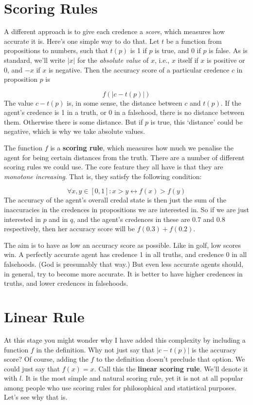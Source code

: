 \section{Scoring Rules}
A different approach is to give each credence a \textit{score}, which measures how accurate it is. Here's one simple way to do that. Let $t$ be a function from propositions to numbers, such that $t(p)$ is 1 if $p$ is true, and 0 if $p$ is false. As is standard, we'll write $|x|$ for the \textit{absolute value} of $x$, i.e., $x$ itself if $x$ is positive or 0, and $-x$ if $x$ is negative. Then the accuracy score of a particular credence $c$ in proposition $p$ is 

\begin{equation*}
f(|c - t(p)|)
\end{equation*}
The value $c - t(p)$ is, in some sense, the distance between $c$ and $t(p)$. If the agent's credence is 1 in a truth, or 0 in a falsehood, there is no distance between them. Otherwise there is some distance. But if $p$ is true, this `distance' could be negative, which is why we take absolute values.

The function $f$ is a \textbf{scoring rule}, which measures how much we penalise the agent for being certain distances from the truth. There are a number of different scoring rules we could use. The core feature they all have is that they are \textit{monotone increasing}. That is, they satisfy the following condition:

\begin{equation*}
\forall x, y \in [0, 1]: x > y \leftrightarrow f(x) > f(y)
\end{equation*}
The accuracy of the agent's overall credal state is then just the sum of the inaccuracies in the credences in propositions we are interested in. So if we are just interested in $p$ and in $q$, and the agent's credences in these are 0.7 and 0.8 respectively, then her accuracy score will be $f(0.3) + f(0.2)$.

The aim is to have as low an accuracy score as possible. Like in golf, low scores win. A perfectly accurate agent has credence 1 in all truths, and credence 0 in all falsehoods. (God is presumably that way.) But even less accurate agents should, in general, try to become more accurate. It is better to have higher credences in truths, and lower credences in falsehoods.

\section{Linear Rule}
At this stage you might wonder why I have added this complexity by including a function $f$ in the definition. Why not just say that $|c - t(p)|$ is the accuracy score? Of course, adding the $f$ to the definition doesn't preclude that option. We could just say that $f(x) = x$. Call this the \textbf{linear scoring rule}. We'll denote it with $l$. It is the most simple and natural scoring rule, yet it is not at all popular among people who use scoring rules for philosophical and statistical purposes. Let's see why that is.

